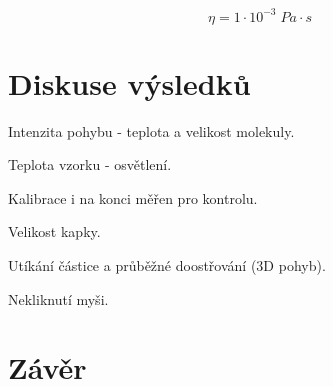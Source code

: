 \begin{equation}
    \nonumber
    \eta = 1 \cdot 10^{-3} \; Pa \cdot s
\end{equation}
    
\section{Diskuse výsledků}

Intenzita pohybu - teplota a velikost molekuly.

Teplota vzorku - osvětlení.

Kalibrace i na konci měřen pro kontrolu.

Velikost kapky.

Utíkání částice a průběžné doostřování (3D pohyb).

Nekliknutí myši.

\section{Závěr}
